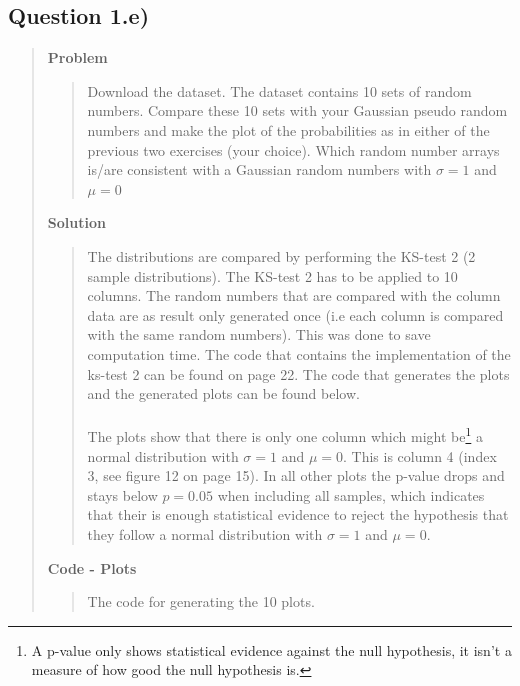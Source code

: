 
\subsection*{\textbf{Question 1.e)}}
\begin{quote}

\textbf{Problem}
\begin{quote}
Download the dataset. The dataset contains 10 sets of random numbers. Compare these 10 sets with your Gaussian pseudo random numbers and make the plot of the probabilities as in either of the previous two exercises (your choice). Which random number arrays is/are consistent with a Gaussian random numbers with $\sigma = 1$ and $\mu = 0$
\end{quote}

\textbf{Solution} 
\begin{quote}
The distributions are compared by performing the KS-test 2 (2 sample distributions). The KS-test 2 has to be applied to 10 columns. The random numbers that are compared with the column data are as result only generated once (i.e each column is  compared with the same random numbers). This was done to save computation time.  The code that contains the implementation of the ks-test 2 can be found on page 22.  The code that generates the plots and the generated plots can be found below.
\\
\\
The plots show that there is only one column which might be\footnote{A p-value only shows statistical evidence against the null hypothesis, it isn't a measure of how good the null hypothesis is.} a normal distribution with $\sigma = 1$ and $\mu = 0$. This is column 4 (index 3, see figure 12 on page 15). In all other plots the p-value drops and stays below $ p = 0.05$ when including all samples, which indicates that their is enough statistical evidence to reject the hypothesis that they follow a normal distribution with $\sigma = 1$ and $\mu = 0$. 

\end{quote}
\newpage

\textbf{Code - Plots}

\begin{quote}
The code for generating the 10 plots. 

\end{quote}
\newpage



\end{quote}
